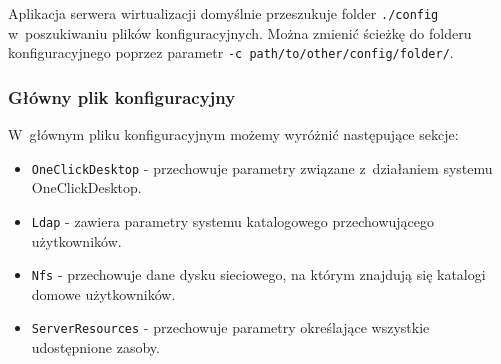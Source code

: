 \documentclass[../opis-rozwiazania.tex]{subfiles}
\begin{document}
Aplikacja serwera wirtualizacji domyślnie przeszukuje folder \texttt{./config} w~poszukiwaniu plików konfiguracyjnych.
Można zmienić ścieżkę do folderu konfiguracyjnego poprzez parametr \texttt{-c\ path/to/other/config/folder/}.

\subsubsection{Główny plik konfiguracyjny}
W~głównym pliku konfiguracyjnym możemy wyróżnić następujące sekcje:
\begin{itemize}
  \item \texttt{OneClickDesktop} - przechowuje parametry związane z~działaniem systemu OneClickDesktop.
  \item \texttt{Ldap} - zawiera parametry systemu katalogowego przechowującego użytkowników.
  \item \texttt{Nfs} - przechowuje dane dysku sieciowego, na którym znajdują się katalogi domowe użytkowników.
  \item \texttt{ServerResources} - przechowuje parametry określające wszystkie udostępnione zasoby.
\end{itemize}
\end{document}
